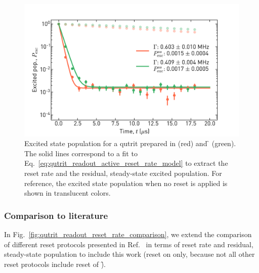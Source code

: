 \begin{figure}[ht]
    \centering
    \includegraphics[width=\textwidth]{appendices/qutrit_readout/figs/ch3_readout_active_reset_fit_20200308_173706.png}
    \caption{Excited state population for a qutrit prepared in \e{} (red) and \f{} (green). The solid lines correspond to a fit to Eq.~\eqref{eq:qutrit_readout_active_reset_rate_model} to extract the reset rate and the residual, steady-state excited population. For reference, the excited state population when no reset is applied is shown in translucent colors.}
    \label{fig:qutrit_readout_active_reset_rates}
\end{figure}{}

\subsubsection{Comparison to literature}
In Fig.~\ref{fig:qutrit_readout_reset_rate_comparison}, we extend the comparison of different reset protocols presented in Ref.~\cite{Magnard2018FastQubit} in terms of reset rate and residual, steady-state population to include this work (reset on \e{} only, because not all other reset protocols include reset of \f).

